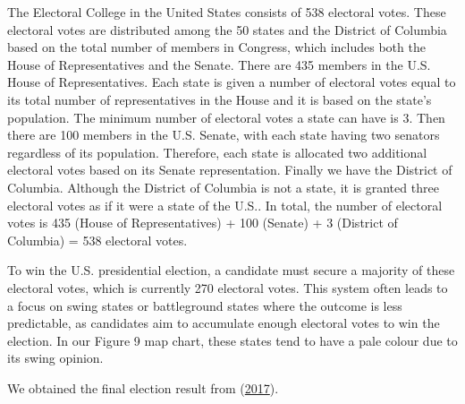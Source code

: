 \documentclass[
  12pt,
]{article}
\begin{document}
The Electoral College in the United States consists of 538 electoral
votes. These electoral votes are distributed among the 50 states and the
District of Columbia based on the total number of members in Congress,
which includes both the House of Representatives and the Senate. There
are 435 members in the U.S. House of Representatives. Each state is
given a number of electoral votes equal to its total number of
representatives in the House and it is based on the state's population.
The minimum number of electoral votes a state can have is 3. Then there
are 100 members in the U.S. Senate, with each state having two senators
regardless of its population. Therefore, each state is allocated two
additional electoral votes based on its Senate representation. Finally
we have the District of Columbia. Although the District of Columbia is
not a state, it is granted three electoral votes as if it were a state
of the U.S.. In total, the number of electoral votes is 435 (House of
Representatives) + 100 (Senate) + 3 (District of Columbia) = 538
electoral votes.

To win the U.S. presidential election, a candidate must secure a
majority of these electoral votes, which is currently 270 electoral
votes. This system often leads to a focus on swing states or
battleground states where the outcome is less predictable, as candidates
aim to accumulate enough electoral votes to win the election. In our
Figure 9 map chart, these states tend to have a pale colour due to its
swing opinion.

We obtained the final election result from
(\protect\hyperlink{ref-Final}{2017}).
\end{document}
